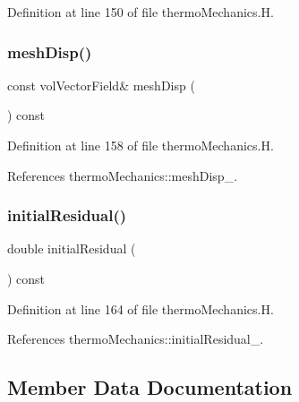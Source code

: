 Definition at line 150 of file thermo\+Mechanics.\+H.

\mbox{\label{classFoam_1_1thermoMechanics_a6213b58fa489b44d156c2c9d39b62619}} 
\subsubsection{\texorpdfstring{mesh\+Disp()}{meshDisp()}}
{\footnotesize\ttfamily const vol\+Vector\+Field\& mesh\+Disp (\begin{DoxyParamCaption}{ }\end{DoxyParamCaption}) const\hspace{0.3cm}{\ttfamily [inline]}}



Definition at line 158 of file thermo\+Mechanics.\+H.



References thermo\+Mechanics\+::mesh\+Disp\+\_\+.

\mbox{\label{classFoam_1_1thermoMechanics_a797eec5a8ba867667928d548a2598932}} 
\subsubsection{\texorpdfstring{initial\+Residual()}{initialResidual()}}
{\footnotesize\ttfamily double initial\+Residual (\begin{DoxyParamCaption}{ }\end{DoxyParamCaption}) const\hspace{0.3cm}{\ttfamily [inline]}}



Definition at line 164 of file thermo\+Mechanics.\+H.



References thermo\+Mechanics\+::initial\+Residual\+\_\+.



\subsection{Member Data Documentation}
\mbox{\label{classFoam_1_1thermoMechanics_ad11fd245eb0e1a8279a432baf8530212}} 

